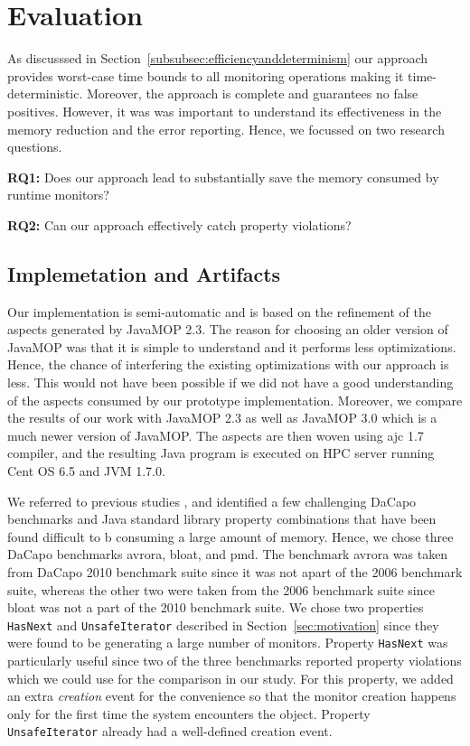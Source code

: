 \section{Evaluation}
\label{sec:evaluation}

As discusssed in Section~\ref{subsubsec:efficiencyanddeterminism} our approach provides worst-case time bounds to all monitoring operations making it time-deterministic. Moreover, the approach is complete and guarantees no false positives. However, it was was important to understand its effectiveness in the memory reduction and the error reporting. Hence, we focussed on two research questions.

{\bf RQ1:} Does our approach lead to substantially save the memory consumed by runtime monitors?

{\bf RQ2:} Can our approach effectively catch property violations?

\subsection{Implemetation and Artifacts}
\label{subsec:implementation}

Our implementation is semi-automatic and is based on the refinement of the aspects generated by JavaMOP 2.3. The reason for choosing an older version of JavaMOP was that it is simple to understand and it performs less optimizations. Hence, the chance of interfering the existing optimizations with our approach is less. This would not have been possible if we did not have a good understanding of the aspects consumed by our prototype implementation. Moreover, we compare the results of our work with JavaMOP 2.3 as well as JavaMOP 3.0 which is a much newer version of JavaMOP. The aspects are then woven using ajc 1.7 compiler, and the resulting Java program is executed on HPC server running Cent OS 6.5 and JVM 1.7.0. 

We referred to previous studies \cite{}, and identified a few challenging DaCapo benchmarks and Java standard library property combinations that have been found difficult to b consuming a large amount of memory. Hence, we chose three DaCapo benchmarks \textsf{avrora}, \textsf{bloat}, and \textsf{pmd}. The benchmark \textsf{avrora} was taken from DaCapo 2010 benchmark suite since it was not apart of the 2006 benchmark suite, whereas the other two were taken from the 2006 benchmark suite since \textsf{bloat} was not a part of the 2010 benchmark suite. We chose two properties \texttt{HasNext} and \texttt{UnsafeIterator} described in Section~\ref{sec:motivation} since they were found to be generating a large number of monitors. Property \texttt{HasNext} was particularly useful since two of the three benchmarks reported property violations which we could use for the comparison in our study. For this property, we added an extra \textit{creation} event for the convenience so that the monitor creation happens only for the first time the system encounters the object. Property \texttt{UnsafeIterator} already had a well-defined creation event.

